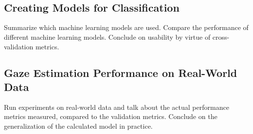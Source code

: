 \begin{minipage}{\linewidth}
{\begin{tabular}{ccccccc}
  \end{tabular}
  }
  \label{fig:wlhspcaimages}
  \end{minipage}\\\\



\subsection{Creating Models for Classification}
\label{sub:CreatingModelsforClassification}
Summarize which machine learning models are used.
Compare the performance of different machine learning models.
Conclude on usability by virtue of cross-validation metrics.
\subsection{Gaze Estimation Performance on Real-World Data}
\label{sub:GazeEstimationPerformanceonReal-WorldData}
Run experiments on real-world data and talk about the actual performance metrics measured, compared to the validation metrics.
Conclude on the generalization of the calculated model in practice.
